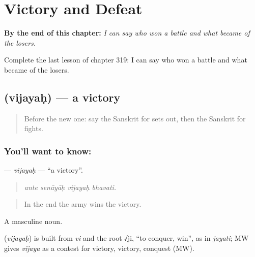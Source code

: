 
\chapter{Victory and Defeat}
\label{ch:sa-victory-and-defeat}

\begin{chapteropening}
\textbf{By the end of this chapter:} \emph{I can say who won a battle and what became of the losers.}

Complete the last lesson of chapter 319: I can say who won a battle and what became of the losers.
\end{chapteropening}

\section[\texorpdfstring{\sk{विजयः} (vijayaḥ)}{विजयः (vijayaḥ)}]{ (vijayaḥ) — a victory}

\label{lesson:SA-C319-vijayah}



\begin{quote}
Before the new one: say the Sanskrit for sets out, then the Sanskrit for fights.
\end{quote}

\subsection*{You'll want to know: }
\textbf{} — \emph{vijayaḥ} — \textquotedblleft{}a victory\textquotedblright{}.

\begin{quote}
   
\end{quote}

\begin{quote}
\emph{ante senāyāḥ vijayaḥ bhavati.}
\end{quote}

\begin{quote}
In the end the army wins the victory.
\end{quote}

A masculine noun.

\begin{cousinweb}
\textbf{} (\emph{vijayaḥ}) is built from \emph{vi} and the root √ji, \textquotedblleft{}to conquer, win\textquotedblright{}, as in \emph{jayati}; MW gives \emph{vijaya} as a contest for victory, victory, conquest (MW).
\end{cousinweb}

